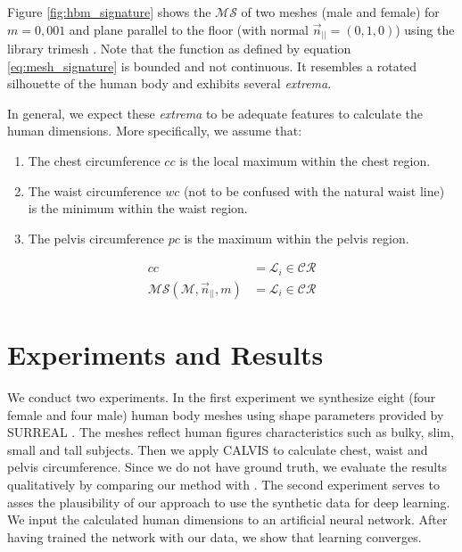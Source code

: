 \documentclass[runningheads, orivec]{llncs}
\begin{document}
Figure \ref{fig:hbm_signature} shows the $\mathcal{MS}$ of two meshes (male 
and female) for 
$m=0,001$ and plane parallel to the floor (with normal 
$\vec{n}_{||} = (0, 
1,0)$) using the library trimesh \cite{trimesh}. Note that the function as 
defined by equation \ref{eq:mesh_signature} is bounded and not continuous. It 
resembles a rotated silhouette of the human body and exhibits several 
\textit{extrema}.

In general, we expect these \textit{extrema} to be adequate features to 
calculate the human dimensions. More specifically, we assume that:
\begin{enumerate}
	\item The chest circumference $cc$ is the local maximum within the chest 
	region.
	\item The waist circumference $wc$ (not to be confused with the natural 
	waist line) is the minimum within the waist region.	
	\item The pelvis circumference $pc$ is the maximum within the pelvis region.
\end{enumerate}

\begin{align}\label{eq:cc}
cc &= \mathcal{L}_i \in \mathcal{CR}\\
\mathcal{MS}(\mathcal{M}, \vec{n}_{||}, m) &= \mathcal{L}_i \in \mathcal{CR}
\end{align}

\section{Experiments and Results}

We conduct two experiments. In the first experiment we synthesize eight (four 
female and four male) human body meshes using shape parameters provided by 
SURREAL \cite{varol17_surreal}.
The meshes reflect human figures characteristics such as bulky, slim, small and 
tall subjects. Then we apply CALVIS to calculate chest, waist and pelvis 
circumference. Since we do not have ground truth, we evaluate the results 
qualitatively by comparing our method 
with \cite{Dibra.2016b}.
The second 
experiment serves to asses the plausibility of our approach to use the 
synthetic data for deep learning. We input the calculated human 
dimensions to an artificial neural network. After having trained the network 
with our data, we show that learning converges.
\end{document}
